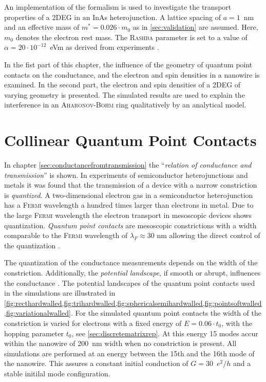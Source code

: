 An implementation of the \gfnc{} formalism is used to investigate the transport properties of a 2DEG in an InAs heterojunction. A lattice spacing of $a=1$~nm and an effective mass of $m^*=0.026 \cdot m_0$ as in \cref{sec:validation} are assumed. Here, $m_0$ denotes the electron rest mass. The \textsc{Rashba} parameter is set to a value of $\alpha = 20 \cdot 10^{-12}$~eVm as derived from experiments \cite{Jacob2009Thesis}.\par
In the fist part of this chapter, the influence of the geometry of quantum point contacts on the conductance, and the electron and spin densities in a nanowire is examined. In the second part, the electron and spin densities of a 2DEG of varying geometry is presented. The simulated results are used to explain the interference in an \textsc{Aharonov-Bohm} ring qualitatively by an analytical model.
\section{Collinear Quantum Point Contacts}
In chapter \ref{sec:conductancefromtransmission} the ``\emph{relation of conductance and transmission}'' \cite{landauer1996} is shown. In experiments of semiconductor heterojunctions \cite{vanHoutenBeenakker2005} and metals \cite{PhysRevB.36.1284} it was found that the transmission of a device with a narrow constriction is \emph{quantized}. A two-dimensional electron gas in a semiconductor heterojunction has a \textsc{Fermi} wavelength a hundred times larger than electrons in metal. Due to the large \textsc{Fermi} wavelength the electron transport in mesoscopic devices shows quantization. \emph{Quantum point contacts} are mesoscopic constrictions with a width comparable to the \textsc{Fermi} wavelength of $\lambda_F \approx 30\text{~nm}$ allowing the direct control of the quantization \cite{vanHoutenBeenakker2005}.\par
The quantization of the conductance measurements depends on the width of the constriction. Additionally, the \emph{potential landscape}, if smooth or abrupt, influences the conductance \cite{PhysRevB.44.8017}. The potential landscapes of the quantum point contacts used in the simulations are illustrated in \cref{fig:recthardwalled,fig:trihardwalled,fig:sphericalsemihardwalled,fig:pointsoftwalled,fig:variationalwalled}.
For the simulated quantum point contacts the width of the constriction is varied for electrons with a fixed energy of $E=0.06\cdot t_0$, with the hopping parameter $t_0$, see \cref{sec:discretematrixrep}. At this energy 15 modes accur within the nanowire of 200~nm width when no constriction is present. All simulations are performed at an energy between the 15th and the 16th mode of the nanowire. This assures a constant initial conduction of $G =30$~$e^2/h$ and a stable initilal mode configuration.

